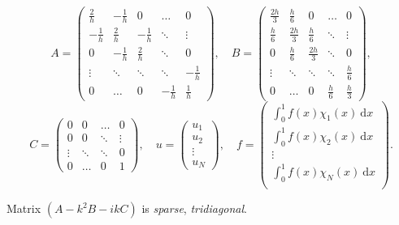 \documentclass[]{beamer}
\newcommand{\dd}{\mathrm{d}}
\newcommand{\vct}{}
\begin{document}
\begin{frame}
\begin{equation*}
  A = \begin{pmatrix}
        \frac{2}{h}   & - \frac{1}{h} & 0             & \hdots        & 0             \\
        - \frac{1}{h} & \frac{2}{h}   & - \frac{1}{h} &  \ddots       & \vdots        \\
        0             & - \frac{1}{h} & \frac{2}{h}   & \ddots        & 0             \\
        \vdots        & \ddots        & \ddots        & \ddots        & - \frac{1}{h} \\
        0             & \hdots        & 0             & - \frac{1}{h} & \frac{1}{h}
      \end{pmatrix},
  \quad
  B = \begin{pmatrix}
        \frac{2h}{3}  & \frac{h}{6}   & 0             & \hdots      & 0           \\
        \frac{h}{6}   & \frac{2h}{3}  & \frac{h}{6}   & \ddots      & \vdots      \\
        0             & \frac{h}{6}   & \frac{2h}{3}  & \ddots      & 0           \\
        \vdots        & \ddots        & \ddots        & \ddots      & \frac{h}{6} \\
        0             & \hdots        & 0             & \frac{h}{6} & \frac{h}{3}
      \end{pmatrix},
\end{equation*}
\begin{equation*}
  C = \begin{pmatrix}
        0       & 0       & \hdots  & 0       \\
        0       & 0       & \ddots  & \vdots  \\
        \vdots  & \ddots  & \ddots  & 0       \\
        0       & \hdots  & 0       & 1
      \end{pmatrix},
  \quad
  \vct{u} = \begin{pmatrix}
              u_1 \\
              u_2 \\
              \vdots \\
              u_N
            \end{pmatrix},
  \quad
  \vct{f} = \begin{pmatrix}
              \int^1_0 f(x) \chi_1(x) \ \dd x \\
              \int^1_0 f(x) \chi_2(x) \ \dd x \\
              \vdots \\
              \int^1_0 f(x) \chi_N(x) \ \dd x \\
            \end{pmatrix}.
\end{equation*}

Matrix $(A - k^2 B - i k C)$ is \emph{sparse}, \emph{tridiagonal}. 
\end{frame}
\end{document}
